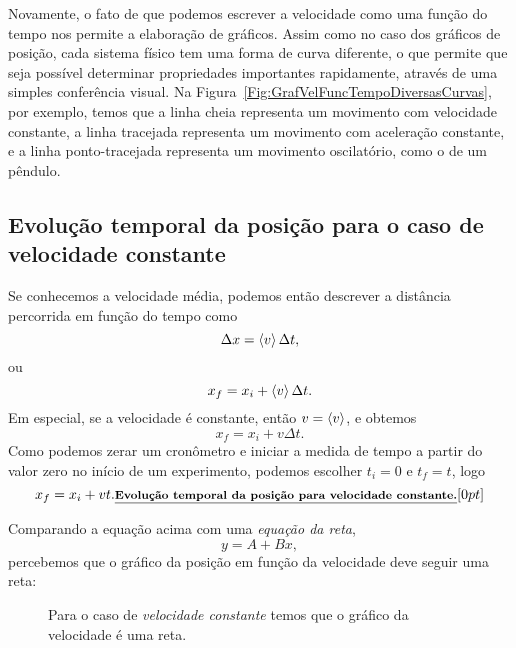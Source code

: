 Novamente, o fato de que podemos escrever a velocidade como uma função do tempo nos permite a elaboração de gráficos. Assim como no caso dos gráficos de posição, cada sistema físico tem uma forma de curva diferente, o que permite que seja possível determinar propriedades importantes rapidamente, através de uma simples conferência visual. Na Figura~\ref{Fig:GrafVelFuncTempoDiversasCurvas}, por exemplo, temos que a linha cheia representa um movimento com velocidade constante, a linha tracejada representa um movimento com aceleração constante, e a linha ponto-tracejada representa um movimento oscilatório, como o de um pêndulo.

\subsection{Evolução temporal da posição para o caso de velocidade constante}

Se conhecemos a velocidade média, podemos então descrever a distância percorrida em função do tempo como
\begin{equation}
  \Delta x = \left\langle{v}\right\rangle \Delta t,
\end{equation}
%
ou
\begin{equation}
    x_f = x_i + \left\langle{v}\right\rangle \Delta t.
\end{equation}
%
Em especial, se a velocidade é constante, então $v = \left\langle{v}\right\rangle$, e obtemos
\begin{equation}
    x_f = x_i + v \Delta t.
\end{equation}
%
Como podemos zerar um cronômetro e iniciar a medida de tempo a partir do valor zero no início de um experimento, podemos escolher $t_i = 0$ e $t_f = t$, logo
\begin{equation}\label{Eq:XX0AT}
  x_f = x_i + vt.\relax{\footnotesize\emph{\textbf{Evolução temporal da posição para velocidade constante.}}}[0pt]
\end{equation}

Comparando a equação acima com uma \emph{equação da reta},
\begin{equation}
    y = A + Bx,
\end{equation}
%
percebemos que o gráfico da posição em função da velocidade deve seguir uma reta:

\begin{figure}
\centering
{}
\caption{Para o caso de \emph{velocidade constante} temos que o gráfico da velocidade é uma reta.}
\end{figure}

